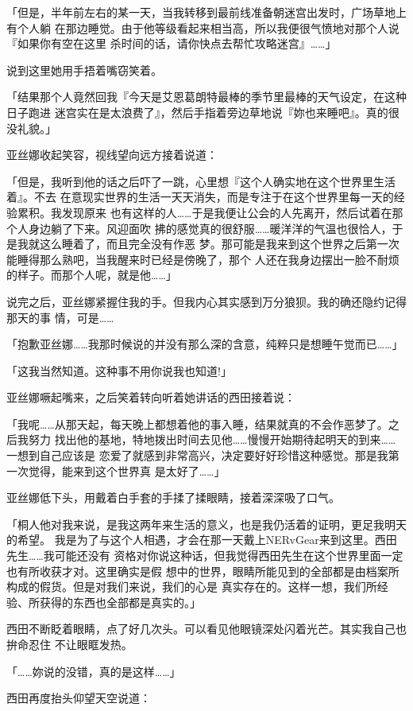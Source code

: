 \documentclass[11pt]{book}
\begin{document}
「但是，半年前左右的某一天，当我转移到最前线准备朝迷宫出发时，广场草地上有个人躺
在那边睡觉。由于他等级看起来相当高，所以我便很气愤地对那个人说『如果你有空在这里
杀时间的话，请你快点去帮忙攻略迷宫』……」

说到这里她用手捂着嘴窃笑着。

「结果那个人竟然回我『今天是艾恩葛朗特最棒的季节里最棒的天气设定，在这种日子跑进
迷宫实在是太浪费了』，然后手指着旁边草地说『妳也来睡吧』。真的很没礼貌。」

亚丝娜收起笑容，视线望向远方接着说道：

「但是，我听到他的话之后吓了一跳，心里想『这个人确实地在这个世界里生活着』。不去
在意现实世界的生活一天天消失，而是专注于在这个世界里每一天的经验累积。我发现原来
也有这样的人……于是我便让公会的人先离开，然后试着在那个人身边躺了下来。风迎面吹
拂的感觉真的很舒服……暖洋洋的气温也很恰人，于是我就这么睡着了，而且完全没有作恶
梦。那可能是我来到这个世界之后第一次能睡得那么熟吧，当我醒来时已经是傍晚了，那个
人还在我身边摆出一脸不耐烦的样子。而那个人呢，就是他……」

说完之后，亚丝娜紧握住我的手。但我内心其实感到万分狼狈。我的确还隐约记得那天的事
情，可是……

「抱歉亚丝娜……我那时候说的并没有那么深的含意，纯粹只是想睡午觉而已……」

「这我当然知道。这种事不用你说我也知道!」

亚丝娜噘起嘴来，之后笑着转向听着她讲话的西田接着说：

「我呢……从那天起，每天晚上都想着他的事入睡，结果就真的不会作恶梦了。之后我努力
找出他的基地，特地拨出时间去见他……慢慢开始期待起明天的到来……一想到自己应该是
恋爱了就感到非常高兴，决定要好好珍惜这种感觉。那是我第一次觉得，能来到这个世界真
是太好了……」

亚丝娜低下头，用戴着白手套的手揉了揉眼睛，接着深深吸了口气。

「桐人他对我来说，是我这两年来生活的意义，也是我仍活着的证明，更足我明天的希望。
我是为了与这个人相遇，才会在那一天戴上NERvGear来到这里。西田先生……我可能还没有
资格对你说这种话，但我觉得西田先生在这个世界里面一定也有所收获才对。这里确实是假
想中的世界，眼睛所能见到的全部都是由档案所构成的假货。但是对我们来说，我们的心是
真实存在的。这样一想，我们所经验、所获得的东西也全部都是真实的。」

西田不断眨着眼睛，点了好几次头。可以看见他眼镜深处闪着光芒。其实我自己也拚命忍住
不让眼眶发热。

「……妳说的没错，真的是这样……」

西田再度抬头仰望天空说道：
\end{document}
